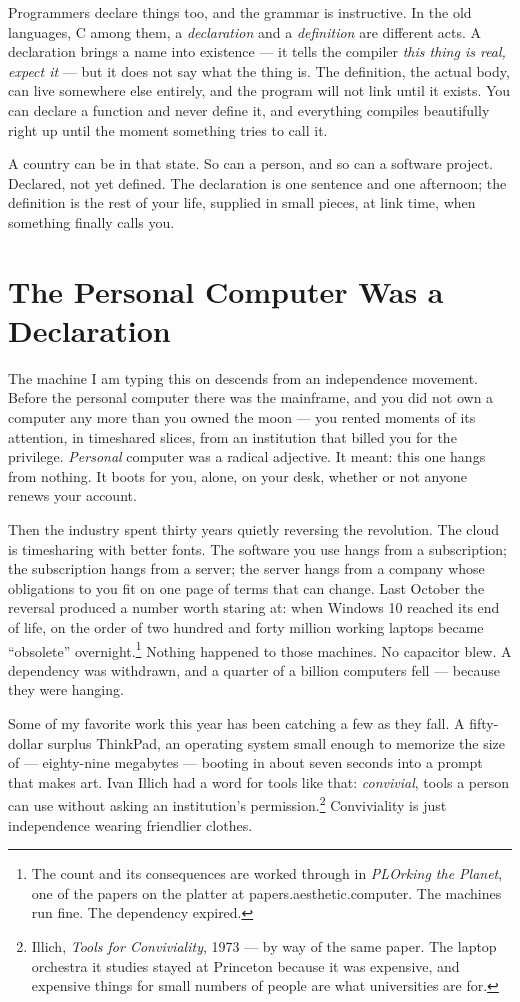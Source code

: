 \documentclass[11pt,letterpaper]{article}
\begin{document}
Programmers declare things too, and the grammar is instructive. In the old languages, C among them, a \textit{declaration} and a \textit{definition} are different acts. A declaration brings a name into existence --- it tells the compiler \textit{this thing is real, expect it} --- but it does not say what the thing is. The definition, the actual body, can live somewhere else entirely, and the program will not link until it exists. You can declare a function and never define it, and everything compiles beautifully right up until the moment something tries to call it.

A country can be in that state. So can a person, and so can a software project. Declared, not yet defined. The declaration is one sentence and one afternoon; the definition is the rest of your life, supplied in small pieces, at link time, when something finally calls you.

\section{The Personal Computer Was a Declaration}

The machine I am typing this on descends from an independence movement. Before the personal computer there was the mainframe, and you did not own a computer any more than you owned the moon --- you rented moments of its attention, in timeshared slices, from an institution that billed you for the privilege. \textit{Personal} computer was a radical adjective. It meant: this one hangs from nothing. It boots for you, alone, on your desk, whether or not anyone renews your account.

Then the industry spent thirty years quietly reversing the revolution. The cloud is timesharing with better fonts. The software you use hangs from a subscription; the subscription hangs from a server; the server hangs from a company whose obligations to you fit on one page of terms that can change. Last October the reversal produced a number worth staring at: when Windows 10 reached its end of life, on the order of two hundred and forty million working laptops became ``obsolete'' overnight.\footnote{The count and its consequences are worked through in \textit{PLOrking the Planet}, one of the papers on the platter at papers.aesthetic.computer. The machines run fine. The dependency expired.} Nothing happened to those machines. No capacitor blew. A dependency was withdrawn, and a quarter of a billion computers fell --- because they were hanging.

Some of my favorite work this year has been catching a few as they fall. A fifty-dollar surplus ThinkPad, an operating system small enough to memorize the size of --- eighty-nine megabytes --- booting in about seven seconds into a prompt that makes art. Ivan Illich had a word for tools like that: \textit{convivial}, tools a person can use without asking an institution's permission.\footnote{Illich, \textit{Tools for Conviviality}, 1973 --- by way of the same paper. The laptop orchestra it studies stayed at Princeton because it was expensive, and expensive things for small numbers of people are what universities are for.} Conviviality is just independence wearing friendlier clothes.
\end{document}
